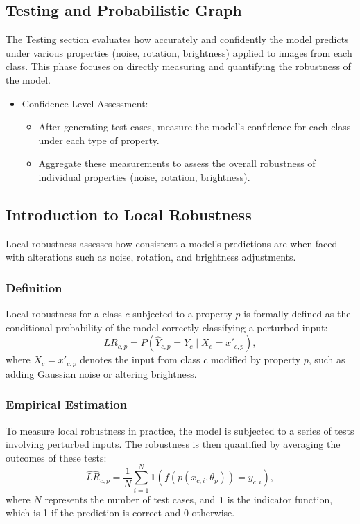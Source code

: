 \documentclass[10pt, conference, a4paper, final]{IEEEtran}
\begin{document}
\subsection{Testing and Probabilistic Graph}

The Testing section evaluates how accurately and confidently the model predicts under various properties (noise, rotation, brightness) applied to images from each class. This phase focuses on directly measuring and quantifying the robustness of the model.
\begin{itemize}

    \item Confidence Level Assessment:
        \begin{itemize}
            \item After generating test cases, measure the model’s confidence for each class under each type of property.
            \item Aggregate these measurements to assess the overall robustness of individual properties (noise, rotation, brightness).
        \end{itemize}

    \end{itemize}


    \subsection{Introduction to Local Robustness}
    Local robustness  assesses how consistent a model's predictions are when faced with alterations such as noise, rotation, and brightness adjustments. 
    \subsubsection{Definition}
    Local robustness for a class \(c\) subjected to a property \(p\) is formally defined as the conditional probability of the model correctly classifying a perturbed input:
    \begin{equation}
        LR_{c,p} = P(\hat{Y}_{c,p} = Y_c \mid X_c = x'_{c,p}),
    \end{equation}
    where \(X_c = x'_{c,p}\) denotes the input from class \(c\) modified by property \(p\), such as adding Gaussian noise or altering brightness.
    
    
    \subsubsection{Empirical Estimation}
    To measure local robustness in practice, the model is subjected to a series of tests involving perturbed inputs. The robustness is then quantified by averaging the outcomes of these tests:
    \begin{equation}
        \hat{LR}_{c,p} = \frac{1}{N} \sum_{i=1}^N \mathbf{1}(f(p(x_{c,i}, \theta_p)) = y_{c,i}),
    \end{equation}
    where \(N\) represents the number of test cases, and \(\mathbf{1}\) is the indicator function, which is 1 if the prediction is correct and 0 otherwise. 
\end{document}
